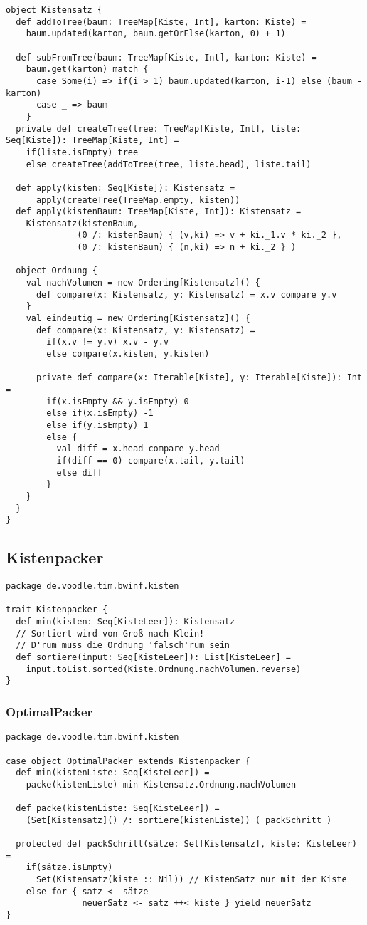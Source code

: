 \begin{lstlisting}
object Kistensatz {
  def addToTree(baum: TreeMap[Kiste, Int], karton: Kiste) =
    baum.updated(karton, baum.getOrElse(karton, 0) + 1)
  
  def subFromTree(baum: TreeMap[Kiste, Int], karton: Kiste) =
    baum.get(karton) match {
      case Some(i) => if(i > 1) baum.updated(karton, i-1) else (baum - karton)
      case _ => baum
    }
  private def createTree(tree: TreeMap[Kiste, Int], liste: Seq[Kiste]): TreeMap[Kiste, Int] =
    if(liste.isEmpty) tree
    else createTree(addToTree(tree, liste.head), liste.tail)

  def apply(kisten: Seq[Kiste]): Kistensatz =
      apply(createTree(TreeMap.empty, kisten))
  def apply(kistenBaum: TreeMap[Kiste, Int]): Kistensatz =
    Kistensatz(kistenBaum,
              (0 /: kistenBaum) { (v,ki) => v + ki._1.v * ki._2 },
              (0 /: kistenBaum) { (n,ki) => n + ki._2 } )

  object Ordnung {
    val nachVolumen = new Ordering[Kistensatz]() {
      def compare(x: Kistensatz, y: Kistensatz) = x.v compare y.v
    }
    val eindeutig = new Ordering[Kistensatz]() {
      def compare(x: Kistensatz, y: Kistensatz) =
        if(x.v != y.v) x.v - y.v
        else compare(x.kisten, y.kisten)

      private def compare(x: Iterable[Kiste], y: Iterable[Kiste]): Int =
        if(x.isEmpty && y.isEmpty) 0
        else if(x.isEmpty) -1
        else if(y.isEmpty) 1
        else {
          val diff = x.head compare y.head
          if(diff == 0) compare(x.tail, y.tail)
          else diff
        }
    }
  }
}
\end{lstlisting}
\clearpage
\subsection{Kistenpacker}
\begin{lstlisting}
package de.voodle.tim.bwinf.kisten

trait Kistenpacker {
  def min(kisten: Seq[KisteLeer]): Kistensatz
  // Sortiert wird von Groß nach Klein!
  // D'rum muss die Ordnung 'falsch'rum sein
  def sortiere(input: Seq[KisteLeer]): List[KisteLeer] =
    input.toList.sorted(Kiste.Ordnung.nachVolumen.reverse)
}
\end{lstlisting}
\subsubsection{OptimalPacker}
\begin{lstlisting}
package de.voodle.tim.bwinf.kisten

case object OptimalPacker extends Kistenpacker {
  def min(kistenListe: Seq[KisteLeer]) =
    packe(kistenListe) min Kistensatz.Ordnung.nachVolumen
 
  def packe(kistenListe: Seq[KisteLeer]) =
    (Set[Kistensatz]() /: sortiere(kistenListe)) ( packSchritt )

  protected def packSchritt(sätze: Set[Kistensatz], kiste: KisteLeer) =
    if(sätze.isEmpty)
      Set(Kistensatz(kiste :: Nil)) // KistenSatz nur mit der Kiste
    else for { satz <- sätze
               neuerSatz <- satz ++< kiste } yield neuerSatz
}
\end{lstlisting}
